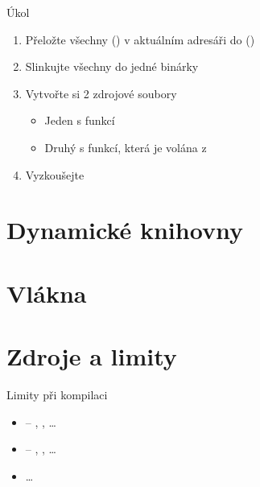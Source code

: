 \begin{frame}{Úkol}

  \begin{enumerate}
    \item Přeložte všechny  () v aktuálním adresáři do
       ()
    \item Slinkujte všechny  do jedné binárky

    \item Vytvořte si 2 zdrojové soubory
    \begin{itemize}
      \item Jeden s funkcí 
      \item Druhý s funkcí, která je volána z 
    \end{itemize}

    \item Vyzkoušejte
  \end{enumerate}

\end{frame}

\section{Dynamické knihovny}
\frame{\sectionpage}



\section{Vlákna}
\frame{\sectionpage}



\section{Zdroje a limity}
\frame{\sectionpage}

\begin{frame}{Limity při kompilaci}

  \begin{itemize}
    \item {} -- , , \dots
    \item {} -- , , \dots
    \item \dots
  \end{itemize}

\end{frame}


